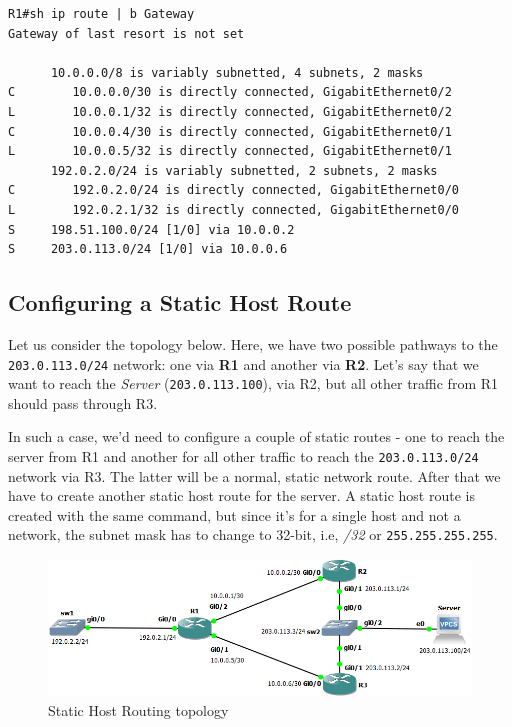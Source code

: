 \vspace{-15pt}
\begin{verbatim}
R1#sh ip route | b Gateway
Gateway of last resort is not set

      10.0.0.0/8 is variably subnetted, 4 subnets, 2 masks
C        10.0.0.0/30 is directly connected, GigabitEthernet0/2
L        10.0.0.1/32 is directly connected, GigabitEthernet0/2
C        10.0.0.4/30 is directly connected, GigabitEthernet0/1
L        10.0.0.5/32 is directly connected, GigabitEthernet0/1
      192.0.2.0/24 is variably subnetted, 2 subnets, 2 masks
C        192.0.2.0/24 is directly connected, GigabitEthernet0/0
L        192.0.2.1/32 is directly connected, GigabitEthernet0/0
S     198.51.100.0/24 [1/0] via 10.0.0.2
S     203.0.113.0/24 [1/0] via 10.0.0.6
\end{verbatim}
\vspace{-10pt}

\subsection{Configuring a Static Host Route}
Let us consider the topology below. Here, we have two possible pathways to the \verb|203.0.113.0/24| network: one via \textbf{R1} and another via \textbf{R2}. Let's say that we want to reach the \textit{Server} (\verb|203.0.113.100|), via R2, but all other traffic from R1 should pass through R3. 

In such a case, we'd need to configure a couple of static routes - one to reach the server from R1 and another for all other traffic to reach the \verb|203.0.113.0/24| network via R3. The latter will be a normal, static network route. After that we have to create another static host route for the server. A static host route is created with the same command, but since it's for a single host and not a network, the subnet mask has to change to 32-bit, i.e, \textit{/32} or \verb|255.255.255.255|.

\noindent
\begin{figure}[H]
\centering
\includegraphics[width=0.9\linewidth]{"ICND1/2. Routers/chapters/3.1.b Static Host Routing"}
\caption{Static Host Routing topology}
\label{fig:9.1.b}
\end{figure}

